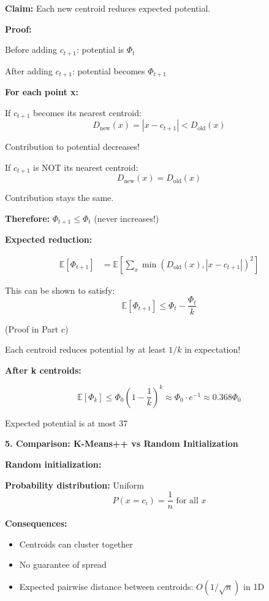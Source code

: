 \documentclass[12pt]{article}
\begin{document}
\begin{explanation}
\textbf{Claim:} Each new centroid reduces expected potential.

\textbf{Proof:}

Before adding $c_{t+1}$: potential is $\Phi_t$

After adding $c_{t+1}$: potential becomes $\Phi_{t+1}$

\textbf{For each point x:}

If $c_{t+1}$ becomes its nearest centroid:
\[
D_{\text{new}}(x) = |x - c_{t+1}| < D_{\text{old}}(x)
\]

Contribution to potential decreases!

If $c_{t+1}$ is NOT its nearest centroid:
\[
D_{\text{new}}(x) = D_{\text{old}}(x)
\]

Contribution stays the same.

\textbf{Therefore:} $\Phi_{t+1} \leq \Phi_t$ (never increases!)

\textbf{Expected reduction:}

\begin{align*}
\mathbb{E}[\Phi_{t+1}] &= \mathbb{E}\left[\sum_{x} \min(D_{\text{old}}(x), |x - c_{t+1}|)^2\right]
\end{align*}

This can be shown to satisfy:
\[
\mathbb{E}[\Phi_{t+1}] \leq \Phi_t - \frac{\Phi_t}{k}
\]

(Proof in Part c)

Each centroid reduces potential by at least $1/k$ in expectation!

\textbf{After k centroids:}

\[
\mathbb{E}[\Phi_k] \leq \Phi_0 \left(1 - \frac{1}{k}\right)^k \approx \Phi_0 \cdot e^{-1} \approx 0.368 \Phi_0
\]

Expected potential is at most 37%

\textbf{5. Comparison: K-Means++ vs Random Initialization}

\textbf{Random initialization:}

\textbf{Probability distribution:} Uniform
\[
P(x = c_i) = \frac{1}{n} \text{ for all } x
\]

\textbf{Consequences:}
\begin{itemize}
    \item Centroids can cluster together
    \item No guarantee of spread
    \item Expected pairwise distance between centroids: $O(1/\sqrt{n})$ in 1D
\end{itemize}


\end{explanation}
\end{document}

